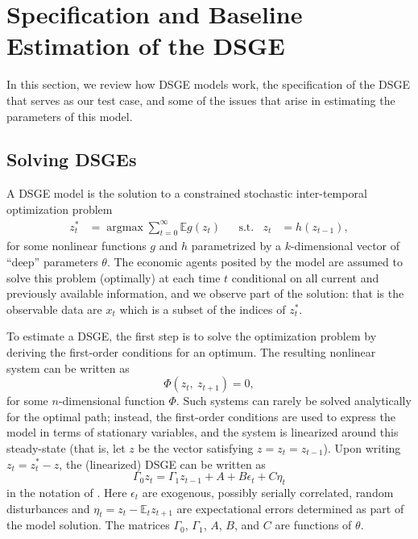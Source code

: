 \documentclass[11pt]{article}
\newcommand{\E}{\mathbb{E}}
\DeclareMathOperator*{\argmax}{argmax}
\begin{document}
\clearpage

\hypertarget{specification-and-baseline-estimation-of-the-dsge}{%
\section{Specification and Baseline Estimation of the
DSGE}\label{specification-and-baseline-estimation-of-the-dsge}}

In this section, we review how DSGE models work, the specification of
the \citet{SmetsWouters2007} DSGE that serves as our test case, and some
of the issues that arise in estimating the parameters of this model.

\hypertarget{sec:solveDSGEs}{%
\subsection{Solving DSGEs}\label{sec:solveDSGEs}}

A DSGE model is the solution to a constrained stochastic inter-temporal
optimization problem \begin{align}
  z_t^* &=\argmax \sum_{t=0}^\infty \E g(z_t) &&\mbox{s.t.}&z_t&=h(z_{t-1}),
\end{align} for some nonlinear functions \(g\) and \(h\) parametrized by
a \(k\)-dimensional vector of ``deep'' parameters \(\theta\). The
economic agents posited by the model are assumed to solve this problem
(optimally) at each time \(t\) conditional on all current and previously
available information, and we observe part of the solution: that is the
observable data are \(x_t\) which is a subset of the indices of
\(z_t^*\).

To estimate a DSGE, the first step is to solve the optimization problem
by deriving the first-order conditions for an optimum. The resulting
nonlinear system can be written as \begin{equation}
  \Phi(z_t,\ z_{t+1})=0,
\end{equation} for some \(n\)-dimensional function \(\Phi\). Such
systems can rarely be solved analytically for the optimal path; instead,
the first-order conditions are used to express the model in terms of
stationary variables, and the system is linearized around this
steady-state (that is, let \(z\) be the vector satisfying
\(z=z_t=z_{t-1}\)). Upon writing \(z_t = z^*_t - z\), the (linearized)
DSGE can be written as \begin{equation}
  \Gamma_0 z_t = \Gamma_1 z_{t-1} + A + B \epsilon_t + C \eta_t
  \label{eq:lin-dsge}
\end{equation} in the notation of \citet{Sims2002}. Here \(\epsilon_t\)
are exogenous, possibly serially correlated, random disturbances and
\(\eta_t=z_t - \E_t z_{t+1}\) are expectational errors determined as
part of the model solution. The matrices \(\Gamma_0\), \(\Gamma_1\),
\(A\), \(B\), and \(C\) are functions of \(\theta\).
\end{document}
